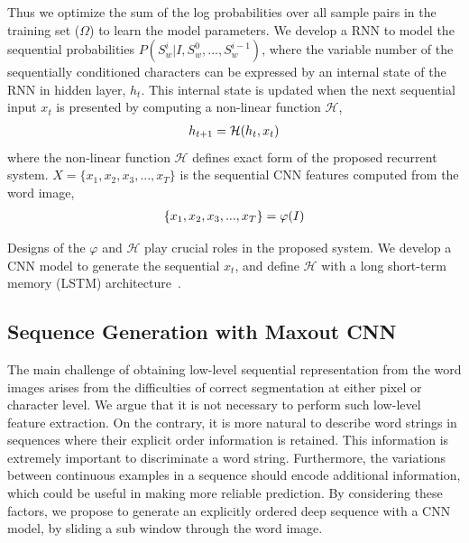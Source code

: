 \documentclass[letterpaper]{article}
\begin{document}
Thus we optimize the sum of the log probabilities over all sample pairs in the training set ($\Omega$) to learn the model parameters. We develop a RNN to model the sequential probabilities $P(S_w^i|I,S_w^0,...,S_w^{i-1})$, where the variable number of the  sequentially conditioned characters can be expressed by an internal state of the RNN in hidden layer, $h_t$. This internal state is updated when the next sequential input $x_t$ is presented by computing a non-linear function $\mathcal{H}$,
\begin{eqnarray}
\abovedisplayskip
\belowdisplayskip
h_{t+1}=\mathcal{H}(h_t,x_t)
\end{eqnarray}
where the non-linear function $\mathcal{H}$ defines exact form of the proposed recurrent system. $X=\{x_1,x_2,x_3,...,x_T\}$ is the sequential CNN features computed from the word image,
\begin{eqnarray}
\abovedisplayskip
\belowdisplayskip
\{x_1,x_2,x_3,...,x_T\}=\varphi(I)
\end{eqnarray}

Designs of the $\varphi$ and $\mathcal{H}$ play crucial roles in the proposed system. We develop a CNN model to generate the sequential $x_t$, and define $\mathcal{H}$ with a long short-term memory (LSTM) architecture~\cite{Hochreiter1997}.



\subsection{Sequence Generation with Maxout CNN}

The main challenge of obtaining low-level sequential representation from the word images arises from the difficulties of correct segmentation at either pixel or character level.
We argue that it is not necessary to perform such low-level feature extraction.
On the contrary, it is more natural to describe word strings in sequences where their explicit order information is retained. This information is extremely important to discriminate a word string. Furthermore, the variations between continuous examples in a sequence should encode additional information, which could be useful in making more reliable prediction. By considering these factors, we propose to generate an explicitly ordered deep sequence with a CNN model, by sliding a sub window through the word image.
\end{document}
